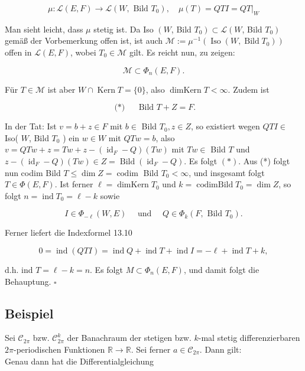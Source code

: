\documentclass[10pt, letterpaper]{article}
\begin{document}
$$
\mu: \mathcal{L}(E, F) \rightarrow \mathcal{L}\left(W, \text { Bild } T_{0}\right), \quad \mu(T)=Q T I=\left.Q T\right|_{W}
$$

Man sieht leicht, dass $\mu$ stetig ist. Da Iso $\left(W\right.$, Bild $\left.T_{0}\right) \subset \mathcal{L}\left(W\right.$, Bild $\left.T_{0}\right)$ gemäß der Vorbemerkung offen ist, ist auch $\mathcal{M}:=\mu^{-1}\left(\operatorname{Iso}\left(W, \operatorname{Bild} T_{0}\right)\right)$ offen in $\mathcal{L}(E, F)$, wobei $T_{0} \in \mathcal{M}$ gilt. Es reicht nun, zu zeigen:

$$
\mathcal{M} \subset \Phi_{n}(E, F) .
$$

Für $T \in \mathcal{M}$ ist aber $W \cap \operatorname{Kern} T=\{0\}$, also $\operatorname{dimKern} T<\infty$. Zudem ist

$$
\text { (*) } \quad \text { Bild } T+Z=F .
$$

In der Tat: Ist $v=b+z \in F$ mit $b \in$ Bild $T_{0}, z \in Z$, so existiert wegen $Q T I \in$ Iso( $W$, Bild $T_{0}$ ) ein $w \in W$ mit $Q T w=b$, also $v=Q T w+z=T w+z-\left(\operatorname{id}_{F}-Q\right)(T w)$ mit $T w \in$ Bild $T$ und $z-\left(\operatorname{id}_{F}-Q\right)(T w) \in Z=\operatorname{Bild}\left(\operatorname{id}_{F}-Q\right)$. Es folgt $(*)$. Aus (*) folgt nun codim Bild $T \leq \operatorname{dim} Z=\operatorname{codim}$ Bild $T_{0}<\infty$, und insgesamt folgt $T \in \Phi(E, F)$. Ist ferner $\ell=\operatorname{dimKern} T_{0}$ und $k=\operatorname{codimBild} T_{0}=\operatorname{dim} Z$, so folgt $n=\operatorname{ind} T_{0}=\ell-k$ sowie

$$
I \in \Phi_{-\ell}(W, E) \quad \text { und } \quad Q \in \Phi_{k}\left(F, \text { Bild } T_{0}\right) .
$$

Ferner liefert die Indexformel 13.10

$$
0=\operatorname{ind}(Q T I)=\operatorname{ind} Q+\operatorname{ind} T+\operatorname{ind} I=-\ell+\operatorname{ind} T+k,
$$

d.h. ind $T=\ell-k=n$. Es folgt $M \subset \Phi_{n}(E, F)$, und damit folgt die Behauptung. \(\square\)

\subsection*{Beispiel}
Sei $\mathcal{C}_{2 \pi}$ bzw. $\mathcal{C}_{2 \pi}^{k}$ der Banachraum der stetigen bzw. $k$-mal stetig differenzierbaren $2 \pi$-periodischen Funktionen $\mathbb{R} \rightarrow \mathbb{R}$. Sei ferner $a \in \mathcal{C}_{2 \pi}$. Dann gilt:\\
Genau dann hat die Differentialgleichung
\end{document}
